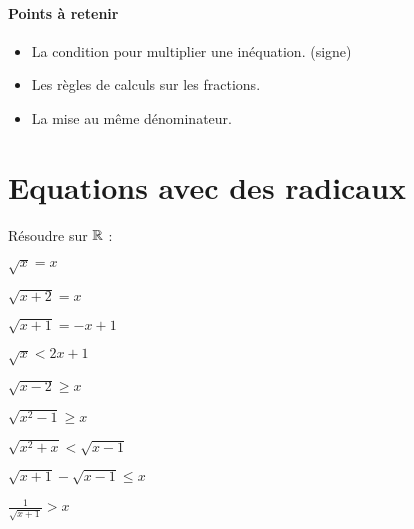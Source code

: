 \documentclass[a4paper, 11pt]{article}
\newcommand{\subscript}[2]{$#1 _ #2$}
\begin{document}
\paragraph{Points à retenir}
\begin{itemize}
    \item La condition pour multiplier une inéquation. (signe)
    \item Les règles de calculs sur les fractions.
    \item La mise au même dénominateur. 
\end{itemize}




\section{Equations avec des radicaux}
\begin{exercice}
    Résoudre sur $\mathbb{R}$ :\\


\begin{enumerate}[label=(\subscript{R}{{\arabic*}}) : $\,$]
\hspace{1cm}
\begin{minipage}{0.33\textwidth}
   \item $ \sqrt{x}=x$\\
        \item $ \sqrt{x+2}=x$\\
        \item $\sqrt{x+1}= -x+1$
\end{minipage}
\begin{minipage}{0.3\textwidth}
        \item $\sqrt{x}< 2x+1$\\
        \item $\sqrt{x-2}\geq x$\\
         \item $ \sqrt{x^2-1}\geq x$
\end{minipage}
\begin{minipage}{0.3\textwidth}
        \item $ \sqrt{x^2+x}< \sqrt{x-1}$\\
        \item $ \sqrt{x+1}-\sqrt{x-1}\leq x$\\
         \item $ \frac{1}{\sqrt{x+1}}> x$
\end{minipage}
\end{enumerate}

\end{exercice}
\end{document}

